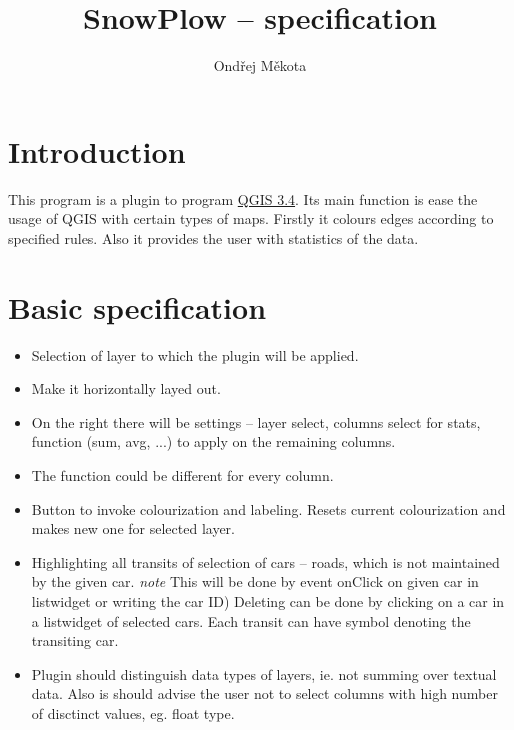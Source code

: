 \documentclass[12pt,a4paper]{article}
\begin{document}
\title{SnowPlow – specification}
\author{Ondřej Měkota}

\maketitle
\pagebreak
\section{Introduction}

\par This program is a plugin to program \href{https://qgis.org/en/site/index.html}{QGIS 3.4}. 
Its main function is ease the usage of QGIS with certain types of maps.
Firstly it colours edges according to specified rules.
Also it provides the user with statistics of the data.


\section{Basic specification}
\begin{itemize}
    \item Selection of layer to which the plugin will be applied.
    \item Make it horizontally layed out.
    \item On the right there will be settings – layer select, columns select for stats, function (sum, avg, ...) to apply on the remaining columns.
    \item The function could be different for every column.
    \item Button to invoke colourization and labeling. Resets current colourization and makes new one for selected layer.
    \item Highlighting all transits of selection of cars – roads, which is not maintained by the given car. 
        \emph{note} This will be done by event onClick on given car in listwidget or writing the car ID)
        Deleting can be done by clicking on a car in a listwidget of selected cars.
        Each transit can have symbol denoting the transiting car.
    \item Plugin should distinguish data types of layers, ie. not summing over textual data. Also is should advise the user not to select columns with high number of disctinct values, eg. float type.
        

\end{itemize}
\end{document}
